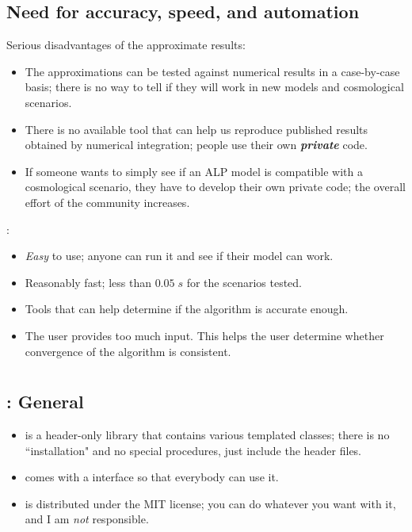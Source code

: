 \documentclass[10pt,utf8,compress,xcolor=dvipsnames]{beamer}
\begin{document}
\subsection{Need for accuracy, speed, and automation}
\begin{frame}{\insertsubsectionhead}
	Serious disadvantages of the approximate results:
	\begin{itemize}
		\item The approximations can be tested against numerical results in a case-by-case basis; there is no way to tell if they will work in new models and cosmological scenarios.
		\item There is no available tool that can help us reproduce published results obtained by numerical integration; people use their own {\bf \em private} code. %
		\item If someone wants to simply see if an ALP model is compatible with a cosmological scenario, they have to develop their own private code; the overall effort of the community increases.
	\end{itemize}

	\mimes:
	\begin{itemize}
		\item {\sl Easy} to use; anyone can run it and see if their model can work.
		\item Reasonably fast; less than $0.05 \; s$ for the scenarios tested.
		\item Tools that can help determine if the algorithm is accurate enough.
		\item The user provides too much input. This helps the user determine whether convergence of the algorithm is consistent. 
	\end{itemize}

\end{frame}


\section{\mimes}
\subsection{\mimes: General}
\begin{frame}{\insertsubsectionhead}
%
%
\begin{itemize}
	\item \mimes is a \CPP header-only library that contains various templated classes; there is no ``installation" and no special procedures, just include the header files. \pause
	\item \mimes comes with a \PY interface so that everybody can use it.\pause
	\item \mimes is distributed under the MIT license; you can do whatever you want with it, and I am {\em not} responsible.\pause
\end{itemize}


\end{frame}
\end{document}
